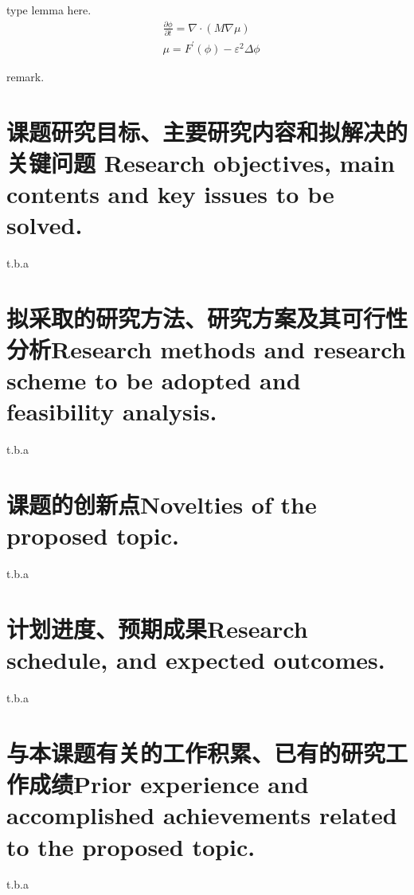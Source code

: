 \documentclass[lang=cn, 11pt, a4paper, AutoFakeBold]{elegantpaper}
\numberwithin{equation}{section}
\begin{document}
{\begin{lemma}
    type lemma here.
    \begin{subequations}\label{phase-field-model-iso}
    \begin{align}
        &\frac{\partial\phi}{\partial t}=\nabla\cdot(M\nabla\mu)\\
        &\mu=F^\prime(\phi)-\varepsilon^2\Delta\phi
    \end{align}
\end{subequations}
\end{lemma}

\begin{remark}
    remark.
\end{remark}

} %

\section{课题研究目标、主要研究内容和拟解决的关键问题\quad\normalsize{ Research objectives, main contents and key issues to be solved.}}

{\kaishu %

t.b.a

\section{拟采取的研究方法、研究方案及其可行性分析\quad\normalsize{Research methods and research scheme to be adopted and feasibility analysis.}}

t.b.a

\section{课题的创新点\quad\normalsize{Novelties of the proposed topic.}}

t.b.a

\section{计划进度、预期成果\quad\normalsize{Research schedule, and expected outcomes.}}

t.b.a

\section{与本课题有关的工作积累、已有的研究工作成绩\quad\normalsize{Prior experience and accomplished achievements related to the proposed topic.}}

t.b.a

} %
\end{document}
